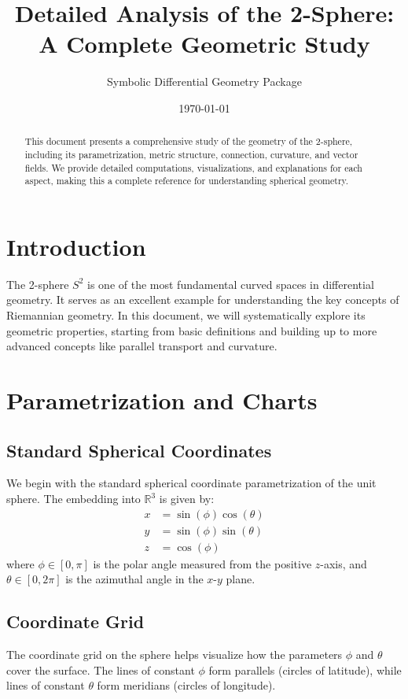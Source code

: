 \documentclass[12pt]{article}
\title{Detailed Analysis of the 2-Sphere: \\ A Complete Geometric Study}
\author{Symbolic Differential Geometry Package}
\date{\today}
\begin{document}
\maketitle

\begin{abstract}
This document presents a comprehensive study of the geometry of the 2-sphere, including its parametrization, metric structure, connection, curvature, and vector fields. We provide detailed computations, visualizations, and explanations for each aspect, making this a complete reference for understanding spherical geometry.
\end{abstract}

\tableofcontents
\newpage

\section{Introduction}
The 2-sphere $S^2$ is one of the most fundamental curved spaces in differential geometry. It serves as an excellent example for understanding the key concepts of Riemannian geometry. In this document, we will systematically explore its geometric properties, starting from basic definitions and building up to more advanced concepts like parallel transport and curvature.

\section{Parametrization and Charts}
\subsection{Standard Spherical Coordinates}
We begin with the standard spherical coordinate parametrization of the unit sphere. The embedding into $\mathbb{R}^3$ is given by:
\[
\begin{aligned}
x &= \sin{\left(\phi \right)} \cos{\left(\theta \right)}\\
y &= \sin{\left(\phi \right)} \sin{\left(\theta \right)}\\
z &= \cos{\left(\phi \right)}
\end{aligned}
\]
where $\phi \in [0,\pi]$ is the polar angle measured from the positive $z$-axis, and $\theta \in [0,2\pi]$ is the azimuthal angle in the $x$-$y$ plane.

\subsection{Coordinate Grid}
The coordinate grid on the sphere helps visualize how the parameters $\phi$ and $\theta$ cover the surface. The lines of constant $\phi$ form parallels (circles of latitude), while lines of constant $\theta$ form meridians (circles of longitude).
\end{document}

